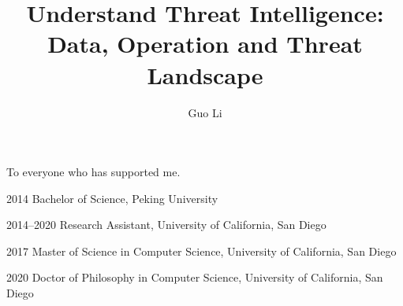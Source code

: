 \documentclass[12pt]{ucsddissertation}
\title{Understand Threat Intelligence: Data, Operation and Threat Landscape}
\author{Guo Li}
\begin{document}
\frontmatter
\maketitle
\makecopyright
\makesignature


\begin{dedication}
\setsinglespacing
\raggedright %
\parindent0pt\parskip\baselineskip
\centering
To everyone who has supported me.
\end{dedication}



\tableofcontents
\listoffigures
\listoftables




\begin{vita}
\noindent
\begin{cv}{}
\begin{cvlist}{}
\item[2014] Bachelor of Science, Peking University
\item[2014--2020] Research Assistant, University of California, San Diego
\item[2017] Master of Science in Computer Science, University of California, San Diego
\item[2020] Doctor of Philosophy in Computer Science, University of California, San Diego
\end{cvlist}
\end{cv}
\end{vita}
\end{document}
